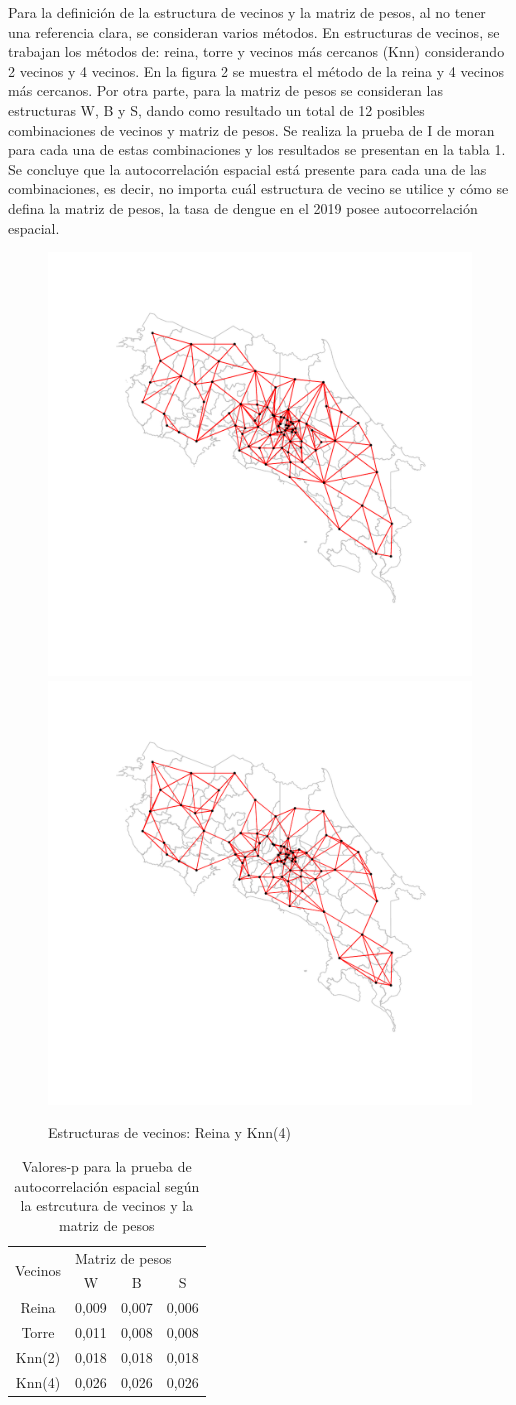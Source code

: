 \documentclass[12pt,a4paper]{article}
\begin{document}
\newline
Para la definición de la estructura de vecinos y la matriz de pesos, al no tener una referencia clara, se consideran varios métodos. En estructuras de vecinos, se trabajan los métodos de: reina, torre y vecinos más cercanos (Knn) considerando 2 vecinos y 4 vecinos. En la figura 2 se muestra el método de la reina y 4 vecinos más cercanos. Por otra parte, para la matriz de pesos se consideran las estructuras W, B y S, dando como resultado un total de 12 posibles combinaciones de vecinos y matriz de pesos. Se realiza la prueba de I de moran para cada una de estas combinaciones y los resultados se presentan en la tabla 1. Se concluye que la autocorrelación espacial está presente para cada una de las combinaciones, es decir, no importa cuál estructura de vecino se utilice y cómo se defina la matriz de pesos, la tasa de dengue en el 2019 posee autocorrelación espacial.
\begin{figure}[hbtp]
\centering
\includegraphics[width=.48\textwidth]{F21.pdf}
\includegraphics[width=.48\textwidth]{F22.pdf}
\caption{Estructuras de vecinos: Reina y Knn(4)}
\end{figure}

\begin{table}[h]
\centering
\caption{Valores-p para la prueba de autocorrelación espacial según la estrcutura de vecinos y la matriz de pesos}
\begin{tabular}{cccc}
\hline
\multirow{2}{*}{Vecinos} & \multicolumn{3}{l}{Matriz de pesos}\\ \cline{2-4} 
&W&B&S\\ \hline
Reina&0,009&0,007&0,006\\
Torre&0,011&0,008&0,008\\
Knn(2)&0,018&0,018&0,018\\
Knn(4)&0,026&0,026&0,026\\ \hline
\end{tabular}
\end{table}
\end{document}
